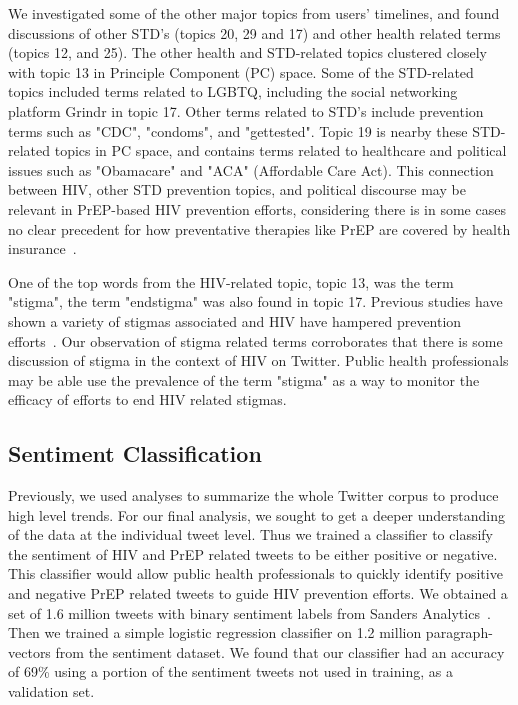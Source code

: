 \documentclass{sig-alternate-05-2015}
\begin{document}
We investigated some of the other major topics from users' timelines, and found discussions of other STD's (topics 20, 29 and 17) and other health related terms (topics 12, and 25). The other health and STD-related topics clustered closely with topic 13 in Principle Component (PC) space. Some of the STD-related topics included terms related to LGBTQ, including the social networking platform Grindr in topic 17. Other terms related to STD's include prevention terms such as "CDC", "condoms", and "gettested". Topic 19 is nearby these STD-related topics in PC space, and contains terms related to healthcare and political issues such as "Obamacare" and "ACA" (Affordable Care Act). This connection between HIV, other STD prevention topics, and political discourse may be relevant in PrEP-based HIV prevention efforts, considering there is in some cases no clear precedent for how preventative therapies like PrEP are covered by health insurance~\cite{liu2014early}.

One of the top words from the HIV-related topic, topic 13, was the term "stigma", the term "endstigma" was also found in topic 17. Previous studies have shown a variety of stigmas associated and HIV have hampered prevention efforts~\cite{liu2014early}. Our observation of stigma related terms corroborates that there is some discussion of stigma in the context of HIV on Twitter. Public health professionals may be able use the prevalence of the term "stigma" as a way to monitor the efficacy of efforts to end HIV related stigmas.

\subsection{Sentiment Classification}

Previously, we used analyses to summarize the whole Twitter corpus to produce high level trends. For our final analysis, we sought to get a deeper understanding of the data at the individual tweet level. Thus we trained a classifier to classify the sentiment of HIV and PrEP related tweets to be either positive or negative. This classifier would allow public health professionals to quickly identify positive and negative PrEP related tweets to guide HIV prevention efforts. We obtained a set of 1.6 million tweets with binary sentiment labels from Sanders Analytics~\cite{sentimentdata}. Then we trained a simple logistic regression classifier on 1.2 million paragraph-vectors from the sentiment dataset. We found that our classifier had an accuracy of 69\% using a portion of the sentiment tweets not used in training, as a validation set.
\end{document}
